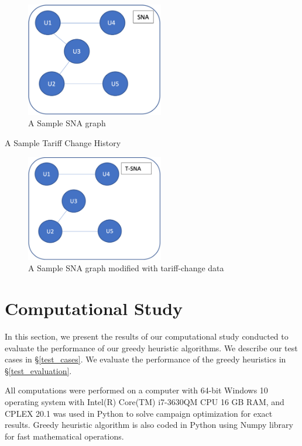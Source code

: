 \documentclass[11pt]{article}
\begin{document}
\begin{figure}[htp]
    \centering
    \includegraphics[width=6cm]{sample_sna}
    \caption{A Sample SNA graph}
    \label{fig:fig_sample_sna}
\end{figure}
\begin{table}[htb]
    \centering
    \caption[Short Caption for LoT]{A Sample Tariff Change History}\label{table:tbl_sample_tariff_change_history}
\end{table}
\begin{figure}[htp]
    \centering
    \includegraphics[width=6cm]{sample_sna_w_tariff}
    \caption{A Sample SNA graph modified with tariff-change data}
    \label{fig:fig_sample_sna_w_tariff}
\end{figure}

\newpage
\section{Computational Study} \label{num-analysis}

In this section, we present the results of our computational study conducted to evaluate the performance of our greedy heuristic algorithms. We describe our test cases in \S \ref{test_cases}. We evaluate the performance of the greedy heuristics in \S \ref{test_evaluation}.

All computations were performed on a computer with 64-bit Windows 10 operating system with Intel(R) Core(TM) i7-3630QM CPU 16 GB RAM, and CPLEX 20.1 was used in Python to solve campaign optimization for exact results. Greedy heuristic algorithm is also coded in Python using Numpy library for fast mathematical operations.
\end{document}
